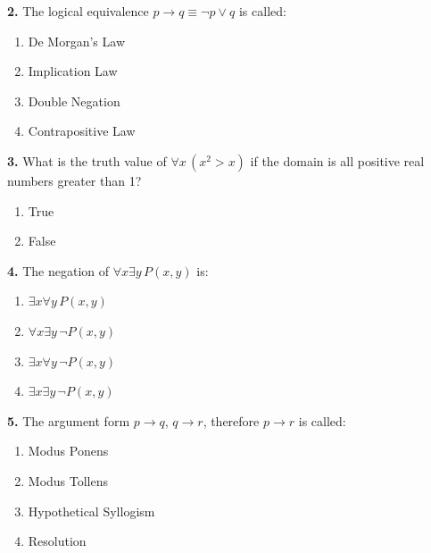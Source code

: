 \documentclass[11pt,a4paper]{article}
\begin{document}
\vspace{25pt}

\textbf{2.} The logical equivalence $p \to q \equiv \neg p \lor q$ is called:

\begin{enumerate}[label=(\Alph*),noitemsep]
    \item De Morgan's Law
    \item Implication Law
    \item Double Negation
    \item Contrapositive Law
\end{enumerate}

\vspace{25pt}

\textbf{3.} What is the truth value of $\forall x\, (x^2 > x)$ if the domain is all positive real numbers greater than 1?

\begin{enumerate}[label=(\Alph*),noitemsep]
    \item True
    \item False
\end{enumerate}

\vspace{25pt}

\textbf{4.} The negation of $\forall x \exists y\, P(x, y)$ is:

\begin{enumerate}[label=(\Alph*),noitemsep]
    \item $\exists x \forall y\, P(x, y)$
    \item $\forall x \exists y\, \neg P(x, y)$
    \item $\exists x \forall y\, \neg P(x, y)$
    \item $\exists x \exists y\, \neg P(x, y)$
\end{enumerate}

\vspace{25pt}

\textbf{5.} The argument form $p \to q$, $q \to r$, therefore $p \to r$ is called:

\begin{enumerate}[label=(\Alph*),noitemsep]
    \item Modus Ponens
    \item Modus Tollens
    \item Hypothetical Syllogism
    \item Resolution
\end{enumerate}

\newpage
\end{document}
